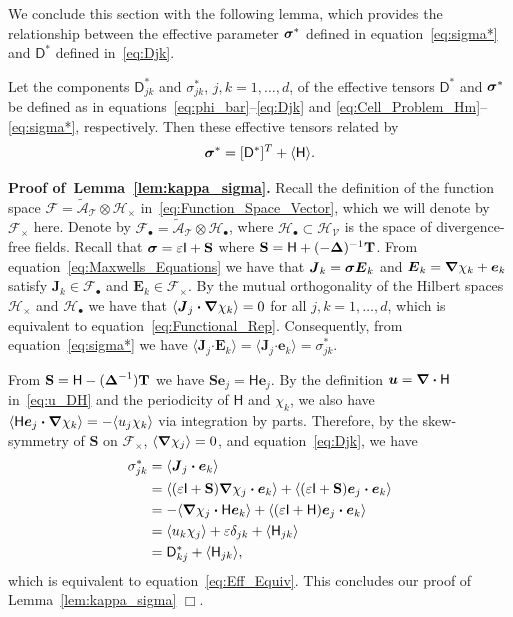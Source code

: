 \documentclass[leqno,onefignum,onetabnum]{siamltex1213}
\newcommand{\lemref}[1]{Lemma~\ref{#1}}
\newcommand{\Tb}{\mathbf{T}}
\newcommand{\Sb}{\mathbf{S}}
\newcommand{\Tc}{\mathcal{T}}
\newcommand{\Vc}{\mathcal{V}}
\newcommand{\Hc}{\mathcal{H}}
\newcommand{\Fc}{\mathcal{F}}
\newcommand{\Ac}{\mathcal{A}}
\newcommand{\Dm}{\mathsf{D}}
\newcommand{\Hm}{\mathsf{H}}
\newcommand{\Ib}{\mathsf{I}}
\newcommand\bsig{\mbox{\boldmath${\sigma}$}}
\newcommand\bDelta{\mbox{\boldmath${\Delta}$}}
\newcommand\bnabla{\mbox{\boldmath${\nabla}$}}
\providecommand\bcdot{\boldsymbol{\cdot}}
\newcommand{\vecJ}{\boldsymbol{J}}
\newcommand{\vecE}{\boldsymbol{E}}
\newcommand{\vecu}{\boldsymbol{u}}
\newcommand{\vece}{\boldsymbol{e}}
\begin{document}
We conclude this section with the following lemma, which provides
the relationship between the effective parameter $\bsig^*$ defined in
equation~\eqref{eq:sigma*} and $\Dm^*$ defined in~\eqref{eq:Djk}.
%
\begin{lemma}\label{lem:kappa_sigma}
%
Let the components $\Dm^*_{jk}$ and $\sigma^*_{jk}$, $j,k=1,\ldots,d$, of the
effective tensors $\Dm^*$ and $\bsig^*$ be defined as in
equations~\eqref{eq:phi_bar}--\eqref{eq:Djk} and
\eqref{eq:Cell_Problem_Hm}--\eqref{eq:sigma*}, respectively. Then  
these effective tensors related by 
% 
\begin{align}\label{eq:Eff_Equiv}
  \bsig^*=[\Dm^*]^T+\langle\Hm\rangle.
\end{align}
%
\end{lemma}
%
%
\textbf{Proof of~\lemref{lem:kappa_sigma}.}\hspace{1ex}
%
Recall the definition of the function space
$\Fc=\tilde{\Ac}_{\Tc}\otimes\Hc_\times$ in~\eqref{eq:Function_Space_Vector},
which we will denote by $\Fc_\times$ here. Denote by
$\Fc_\bullet=\tilde{\Ac}_{\Tc}\otimes\Hc_\bullet$, where $\Hc_\bullet\subset\Hc_{\Vc}$ is the space
of divergence-free fields. Recall that $\bsig=\varepsilon\Ib+\Sb$ where
$\Sb=\Hm+(-\bDelta)^{-1}\Tb$.  From equation~\eqref{eq:Maxwells_Equations} we
have that $\vecJ_k=\bsig\vecE_k$ and $\vecE_k=\bnabla \chi_k+\vece_k$
satisfy $\vecJ_k\in\Fc_\bullet$ and $\vecE_k\in\Fc_\times$. By the mutual
orthogonality of the Hilbert spaces $\Hc_\times$ and $\Hc_\bullet$ we have that
$\langle\vecJ_j\bcdot\bnabla \chi_k\rangle=0$ for all $j,k=1,\ldots,d$, which is
equivalent to equation~\eqref{eq:Functional_Rep}. Consequently, from
equation~\eqref{eq:sigma*} we have
$\langle\vecJ_j\bcdot\vecE_k\rangle=\langle\vecJ_j\bcdot\vece_k\rangle=\sigma^*_{jk}$.


From $\Sb=\Hm-(\bDelta^{-1})\Tb$ we have
$\Sb\vece_j=\Hm\vece_j$. By the definition $\vecu =\bnabla \bcdot\Hm$
in~\eqref{eq:u_DH} and the periodicity of $\Hm$ and $\chi_k$, we also
have 
$\langle\Hm\vece_j\bcdot\bnabla \chi_k\rangle=-\langle u_j\chi_k\rangle$ via integration by
parts. Therefore, by the skew-symmetry of $\Sb$ on $\Fc_\times$,
$\langle\bnabla\chi_j\rangle=0$, and equation~\eqref{eq:Djk}, we have 
%
\begin{align}
  \sigma^*_{jk}&=\langle\vecJ_j\bcdot\vece_k\rangle
      \\\notag
      &=\langle(\varepsilon\Ib+\Sb)\bnabla\chi_j\bcdot\vece_k\rangle
      +\langle(\varepsilon\Ib+\Sb)\vece_j\bcdot\vece_k\rangle
      \\\notag
      &=-\langle\bnabla\chi_j\bcdot\Hm\vece_k\rangle
      +\langle(\varepsilon\Ib+\Hm)\vece_j\bcdot\vece_k\rangle
      \\\notag
      &=\langle u_k\chi_j\rangle+\varepsilon\delta_{jk}+\langle\Hm_{jk}\rangle
      \\\notag
      &=\Dm^*_{kj}+\langle\Hm_{jk}\rangle,
\end{align}
%
which is equivalent to equation~\eqref{eq:Eff_Equiv}. This concludes
our proof of \lemref{lem:kappa_sigma} $\Box$.     
\end{document}
